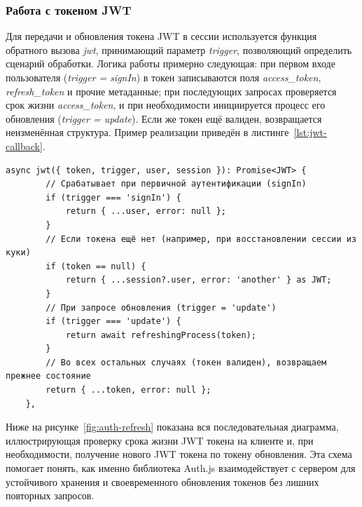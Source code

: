\subsubsection{Работа с токеном JWT}
Для передачи и обновления токена JWT в сессии используется функция обратного вызова \textit{jwt}, принимающий параметр \textit{trigger}, позволяющий определить сценарий обработки. Логика работы примерно следующая: при первом входе пользователя (\textit{trigger = signIn}) в токен записываются поля \textit{access\_token}, \textit{refresh\_token} и прочие метаданные; при последующих запросах проверяется срок жизни \textit{access\_token}, и при необходимости инициируется процесс его обновления (\textit{trigger = update}). Если же токен ещё валиден, возвращается неизменённая структура. Пример реализации приведён в листинге~\ref{lst:jwt-callback}.

\begin{lstlisting}[caption={Функция обратоного вызова jwt}, label={lst:jwt-callback}]
	async jwt({ token, trigger, user, session }): Promise<JWT> {
		// Срабатывает при первичной аутентификации (signIn)
		if (trigger === 'signIn') {
			return { ...user, error: null };
		}
		// Если токена ещё нет (например, при восстановлении сессии из куки)
		if (token == null) {
			return { ...session?.user, error: 'another' } as JWT;
		}
		// При запросе обновления (trigger = 'update')
		if (trigger === 'update') {
			return await refreshingProcess(token);
		}
		// Во всех остальных случаях (токен валиден), возвращаем прежнее состояние
		return { ...token, error: null };
	},
\end{lstlisting}

Ниже на рисунке~\ref{fig:auth-refresh} показана вся последовательная диаграмма, иллюстрирующая проверку срока жизни JWT токена на клиенте и, при необходимости, получение нового JWT токена по токену обновления. Эта схема помогает понять, как именно библиотека Auth.js взаимодействует с сервером для устойчивого хранения и своевременного обновления токенов без лишних повторных запросов.

